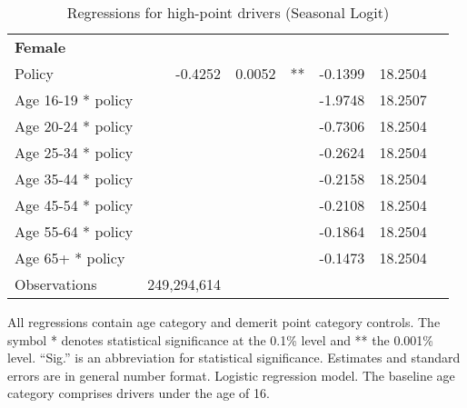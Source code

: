 \begin{table}
\begin{tabular}{l r r l r r l}
\hline 

\textbf{Female} \\ 

Policy             &  -0.4252        &  0.0052       &   **       &  -0.1399        &  18.2504       &            \\ 
Age 16-19 * policy           & & &  &  -1.9748        &  18.2507       &            \\ 
Age 20-24 * policy           & & &  &  -0.7306        &  18.2504       &            \\ 
Age 25-34 * policy           & & &  &  -0.2624        &  18.2504       &            \\ 
Age 35-44 * policy           & & &  &  -0.2158        &  18.2504       &            \\ 
Age 45-54 * policy           & & &  &  -0.2108        &  18.2504       &            \\ 
Age 55-64 * policy           & & &  &  -0.1864        &  18.2504       &            \\ 
Age 65+ * policy           & & &  &  -0.1473        &  18.2504       &            \\ 
Observations & 249,294,614 \\ 


\hline 

\end{tabular} 
\caption{Regressions for high-point drivers (Seasonal Logit)} 
All regressions contain age category and demerit point category controls. 
The symbol * denotes statistical significance at the 0.1\% level 
and ** the 0.001\% level. 
``Sig.'' is an abbreviation for statistical significance. 
Estimates and standard errors are in general number format. 
Logistic regression model. 
The baseline age category comprises drivers under the age of 16. 
\label{tab:seas_logit_high_pt_regs} 
\end{table} 
 
